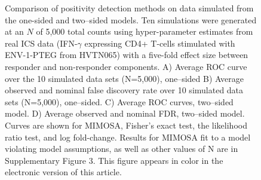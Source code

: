 \documentclass[12pt,oupdraft]{biostatistics}
\begin{document}
\begin{figure}
%
   \caption{Comparison of positivity detection methods on data simulated from the one-sided and two--sided models. Ten simulations were generated at an $N$ of 5,000 total counts using hyper-parameter estimates from real ICS data (IFN-$\gamma$ expressing CD4+ T-cells stimulated with ENV-1-PTEG from HVTN065) with a five-fold effect size between responder and non-responder components. A) Average ROC curve over the 10 simulated data sets (N=5,000), one--sided B) Average observed and nominal false discovery rate over 10 simulated data sets (N=5,000), one--sided. C) Average ROC curves, two--sided model. D) Average observed and nominal FDR, two--sided model. Curves are shown for MIMOSA, Fisher's exact test, the likelihood ratio test, and log fold-change. Results for MIMOSA fit to a model violating model assumptions, as well as other values of N are in Supplementary Figure 3. This figure appears in color in the electronic version of this article.}\label{fig:simulations}
\end{figure}
\end{document}
